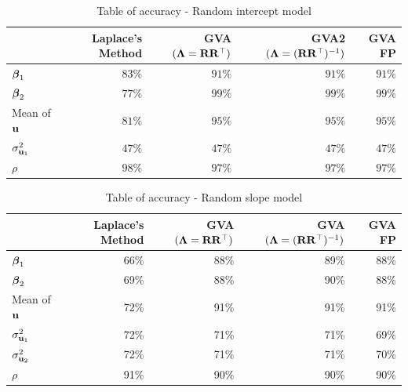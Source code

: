 \documentclass{article}[12pt]
\begin{document}
\begin{table}
\caption{Table of accuracy - Random intercept model}
\label{tab:accuracy_int}
\begin{tabular}{|l|rrrr|}
\hline
& Laplace's Method & GVA $({\boldsymbol \Lambda} = {\bf R} {\bf R}^\top)$ & GVA2 $({\boldsymbol \Lambda} = ({\bf R} {\bf R}^\top)^{-1})$ & GVA FP\\
\hline
${\boldsymbol \beta}_1$ & $83\%$ & $91\%$ & $91\%$ & $91\%$ \\ 
${\boldsymbol \beta}_2$ & $77\%$ & $99\%$ & $99\%$ & $99\%$ \\ 
Mean of ${\bf u}$ & $81\%$ & $95\%$ & $95\%$ & $95\%$ \\
$\sigma^2_{{\bf u}_1}$ & $47\%$ & $47\%$ & $47\%$ & $47\%$ \\ 
$\rho$ & $98\%$ & $97\%$ & $97\%$ & $97\%$ \\ 
\hline
\end{tabular}
\end{table}

\begin{table}
\caption{Table of accuracy - Random slope model}
\label{tab:accuracy_slope}
\begin{tabular}{|l|rrrr|}
\hline
& Laplace's Method & GVA $({\boldsymbol \Lambda} = {\bf R} {\bf R}^\top)$ & GVA $({\boldsymbol \Lambda} = ({\bf R} {\bf R}^\top)^{-1})$ & GVA FP\\
\hline
${\boldsymbol \beta}_1$   &66\%&88\%&89\%&88\%\\
${\boldsymbol \beta}_2$   &69\%&88\%&90\%&88\%\\
Mean of ${\bf u}$    &72\%&91\%&91\%&91\%\\
$\sigma^2_{{\bf u}_1}$ &72\%&71\%&71\%&69\%\\
$\sigma^2_{{\bf u}_2}$ &72\%&71\%&71\%&70\%\\
$\rho$ &91\%&90\%&90\%&90\%\\
\hline
\end{tabular}
\end{table}

\end{document}

